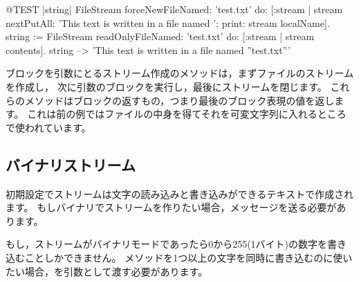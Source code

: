 \documentclass[a4paper,10pt,twoside]{book}
\begin{document}
\begin{code}{@TEST |string|}
FileStream
    forceNewFileNamed: 'test.txt'
    do: [:stream |
        stream
            nextPutAll: 'This text is written in a file named ';
            print: stream localName].
string := FileStream
            readOnlyFileNamed: 'test.txt'
            do: [:stream | stream contents].
string --> 'This text is written in a file named ''test.txt'''
\end{code}

ブロックを引数にとるストリーム作成のメソッドは，まずファイルのストリームを作成し，
次に引数のブロックを実行し，最後にストリームを閉じます。
これらのメソッドはブロックの返すもの，つまり最後のブロック表現の値を返します。
これは前の例ではファイルの中身を得てそれを可変文字列に入れるところで使われています。

\subsection{バイナリストリーム}


初期設定でストリームは文字の読み込みと書き込みができるテキストで作成されます。
もしバイナリでストリームを作りたい場合，メッセージを送る必要があります。


もし，ストリームがバイナリモードであったら0から255(1バイト)の数字を書き込むことしかできません。
メソッドを1つ以上の文字を同時に書き込むのに使いたい場合，を引数として渡す必要があります。
\end{document}
